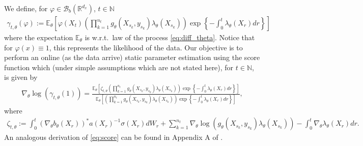 \documentclass[english]{article}
\begin{document}
We define, for $\varphi\in \mathcal{B}_b(\mathbb{R}^{d_x})$, $t\in\mathbb{N}$
\begin{align*}
\gamma_{t,\theta}(\varphi):=\mathbb{E}_{\theta}\left[\varphi(X_t)\left(\prod_{k=1}^{n_t} g_\theta(X_{s_k},y_{s_k})\lambda_\theta(X_{s_k})\right)
\exp\left\{-\int_{0}^t \lambda_\theta(X_r)dr\right\} \right]
\end{align*}
where the expectation $\mathbb{E}_{\theta}$ is w.r.t.~law of the process \eqref{eq:diff_theta}. Notice that for $\varphi(x)\equiv 1$, this represents the likelihood of the data. 
Our objective is to perform an online (as the data arrive) static parameter estimation using the score function which (under simple assumptions which are not stated here), for $t\in\mathbb{N}$, is given by
\begin{align}\label{eq:score}
\nabla_\theta \log \left(\gamma_{t, \theta}(1)\right) = \frac{
\mathbb{E}_{\theta}\left[\zeta_{t,\theta}\left(\prod_{k=1}^{n_t} g_{\theta}(X_{s_k},y_{s_k})\lambda_{\theta}(X_{s_k})\right)
\exp\left\{-\int_{0}^t \lambda_{\theta}(X_r)dr\right\}
\right]
}{\mathbb{E}_{\theta}\left[\left(\prod_{k=1}^{n_t} g_{\theta}(X_{s_k},y_{s_k})\lambda_{\theta}(X_{s_k})\right)
\exp\left\{-\int_{0}^t \lambda_{\theta}(X_r)dr\right\}
\right]},
\end{align}
where %
\begin{align}
\zeta_{t,\theta}:=\int_0^t\left(\nabla_\theta b_\theta\left(X_r\right)\right)^* a\left(X_r\right)^{-1} \sigma\left(X_r\right) d W_r+\sum_{k=1}^{n_t}\nabla_\theta \log\left( g_{\theta}(X_{s_k},y_{s_k})\lambda_{\theta}(X_{s_k})\right)-\int_{0}^t \nabla_\theta \lambda_\theta(X_r)dr.
\label{eq:omega}
\end{align}
An analogous derivation of \eqref{eq:score} can be found in Appendix A of \cite{beskos}.
\end{document}
